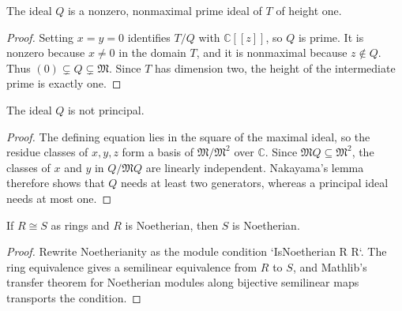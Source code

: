 \begin{lemma}
  \label{lem:node_prime_height}
  The ideal \(Q\) is a nonzero, nonmaximal prime ideal of \(T\) of height one.
\end{lemma}

\begin{proof}
  Setting \(x=y=0\) identifies \(T/Q\) with \(\mathbb C[[z]]\), so \(Q\)
  is prime.  It is nonzero because \(x\neq0\) in the domain \(T\), and it is
  nonmaximal because \(z\notin Q\).  Thus
  \((0)\subsetneq Q\subsetneq\mathfrak M\).  Since \(T\) has dimension two,
  the height of the intermediate prime is exactly one.
\end{proof}

\begin{lemma}
  \label{lem:node_prime_nonprincipal}
  The ideal \(Q\) is not principal.
\end{lemma}

\begin{proof}
  The defining equation lies in the square of the maximal ideal, so the
  residue classes of \(x,y,z\) form a basis of
  \(\mathfrak M/\mathfrak M^2\) over \(\mathbb C\).  Since
  \(\mathfrak M Q\subseteq\mathfrak M^2\), the classes of \(x\) and \(y\)
  in \(Q/\mathfrak M Q\) are linearly independent.  Nakayama's lemma
  therefore shows that \(Q\) needs at least two generators, whereas a
  principal ideal needs at most one.
\end{proof}

\begin{lemma}
  \label{lem:is_noetherian_ring_of_ring_equiv_source}
  If \(R\cong S\) as rings and \(R\) is Noetherian, then \(S\) is
  Noetherian.
\end{lemma}

\begin{proof}
  Rewrite Noetherianity as the module condition `IsNoetherian R R`.
  The ring equivalence gives a semilinear equivalence from \(R\) to \(S\),
  and Mathlib's transfer theorem for Noetherian modules along bijective
  semilinear maps transports the condition.
\end{proof}

